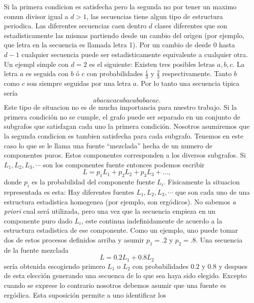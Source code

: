 Si la primera condicion es satisfecha pero la segunda no por tener un
maximo comun divisor igual a $d > 1$, las secuencias tiene algun tipo
de estructura periodica. Las diferentes secuencias caen dentro $d$
clases diferentes que son estadisticamente las mismas partiendo desde
un cambio del origen (por ejemplo, que letra en la secuencia es
llamada letra 1). Por un cambio de desde $0$ hasta $d - 1$ cualquier
secuencia puede ser estadisticamente equivalente a cualquier otra. Un
ejempl simple con $d = 2$ es el siguiente: Existen tres posibles
letras $a, b , c$.  La letra $a$ es seguida con $b$ \'{o} $c$ con
probabilidades $\frac{1}{3}$ y $\frac{2}{3}$ respectivamente.  Tanto
$b$ como $c$ son siempre seguidas por una letra $a$. Por lo tanto una
secuencia tipica ser\'{i}a
$$a b a c a c a c a b a c a b a b a c a c.$$
Este tipo de situacion no es de mucha importancia para nuestro
trabajo.  Si la primera condici\'{o}n no se cumple, el grafo puede ser
separado en un conjunto de subgrafos que satisfagan cada uno la
primera condici\'{o}n.  Nosotros asumiremos que la segunda condicion
es tambien satisfecha para cada subgrafo.  Tenemos en este caso lo que
se le llama una fuente ``mezclada'' hecha de un numero de componentes
puros. Estos componentes corresponden a los diversos subgrafos. Si
$L_{1}, L_{2}, L_{3}, \cdots$ son los componentes fuente entonces
podemos escribir
\begin{equation}
L = p_{1}L_{1} + p_{2}L_{2} + p_{3}L_{3} + \ldots,
\end{equation}
donde $p_{i}$ es la probabilidad del componente fuente $L_{i}$.
Fisicamente la situacion representada es esta: Hay diferentes fuentes
$L_{1}, L_{2}, L_{3}, \cdots$ que son cada uno de una estructura
estadistica homogenea (por ejemplo, son erg\'{o}dicos). No sabemos
\textit{a priori} cual ser\'{a} utilizada, pero una vez que la
secuencia empieza en un componente puro dado $L_{i}$, este continua
indefinidamente de acuerdo a la estructura estadistica de ese
componente.  Como un ejemplo, uno puede tomar dos de estos procesos
definidos arriba y asumir $p_{1} = .2$ y $p_{2} = .8$. Una secuencia
de la fuente mezclada
\begin{equation}
L = 0.2 L_{1} + 0.8 L_{2}
\end{equation}
ser\'{i}a obtenida escogiendo primero $L_{1}$ o $L_{2}$ con
probabilidades $0.2$ y $0.8$ y despues de esta elecci\'{o}n generando
una secuenca de lo que sea haya sido elegido.  Excepto cuando se
exprese lo contrario nosotros debemos asumir que una fuente es
erg\'{o}dica. Esta suposici\'{o}n permite a uno identificar los
